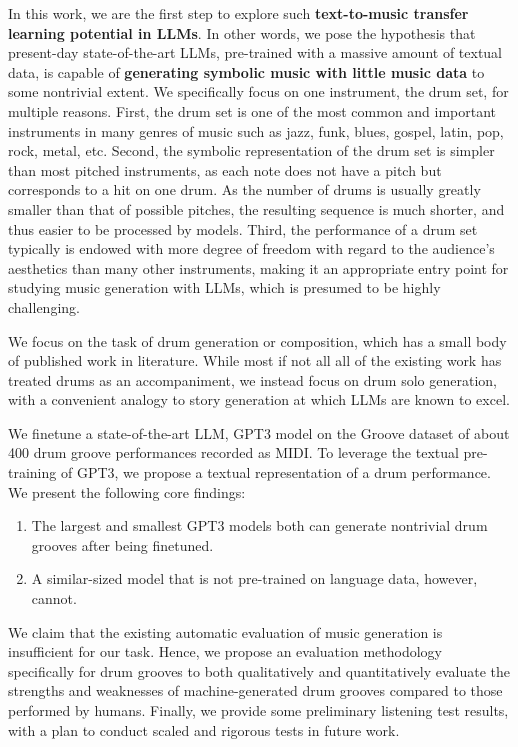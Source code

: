 \documentclass[letterpaper]{article} %
\begin{document}
In this work, we are the first step to explore such \textbf{text-to-music transfer learning potential in LLMs}. In other words, we pose the hypothesis that present-day state-of-the-art LLMs, pre-trained with a massive amount of textual data, is capable of \textbf{generating symbolic music with little music data} to some nontrivial extent. We specifically focus on one instrument, the drum set, for multiple reasons. First, the drum set is one of the most common and important instruments in many genres of music such as jazz, funk, blues, gospel, latin, pop, rock, metal, etc. Second, the symbolic representation of the drum set is simpler than most pitched instruments, as each note does not have a pitch but corresponds to a hit on one drum. As the number of drums is usually greatly smaller than that of possible pitches, the resulting sequence is much shorter, and thus easier to be processed by models. Third, the performance of a drum set typically is endowed with more degree of freedom with regard to the audience's aesthetics than many other instruments, making it an appropriate entry point for studying music generation with LLMs, which is presumed to be highly challenging.

We focus on the task of drum generation or composition, which has a small body of published work in literature. While most if not all all of the existing work has treated drums as an accompaniment, we instead focus on drum solo generation, with a convenient analogy to story generation at which LLMs are known to excel.

We finetune a state-of-the-art LLM, GPT3 model \cite{NEURIPS2020_1457c0d6} on the Groove dataset \cite{gillick2019learning} of about 400 drum groove performances recorded as MIDI. To leverage the textual pre-training of GPT3, we propose a textual representation of a drum performance. We present the following core findings:
\begin{enumerate}
\item The largest and smallest GPT3 models both can generate nontrivial drum grooves after being finetuned.
\item A similar-sized model that is not pre-trained on language data, however, cannot.
\end{enumerate}
We claim that the existing automatic evaluation of music generation is insufficient for our task. Hence, we propose an evaluation methodology specifically for drum grooves to both qualitatively and quantitatively evaluate the strengths and weaknesses of machine-generated drum grooves compared to those performed by humans. Finally, we provide some preliminary listening test results, with a plan to conduct scaled and rigorous tests in future work.
\end{document}
